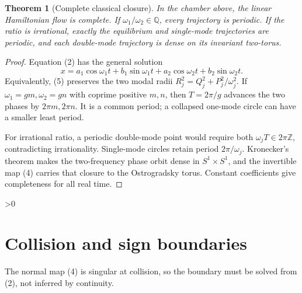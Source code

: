 \documentclass[10pt]{article}
\newtheorem{theorem}{Theorem}
\providecommand{\CRevisionRound}{2}
\begin{document}
\begin{theorem}[Complete classical closure]
In the chamber above, the linear Hamiltonian flow is complete.  If
\(\omega _1/\omega _2\in\mathbb Q\), every trajectory is periodic.  If the
ratio is irrational, exactly the equilibrium and single-mode trajectories
are periodic, and each double-mode trajectory is dense on its invariant
two-torus.
\end{theorem}

\begin{proof}
Equation (2) has the general solution
\begin{equation}
x= a_1\cos\omega _1t+b_1\sin\omega _1t
  +a_2\cos\omega _2t+b_2\sin\omega _2t.
\end{equation}
Equivalently, (5) preserves the two modal radii
\(R_j^2=Q_j^2+P_j^2/\omega_j^2\).  If
\(\omega _1=gm,\omega _2=gn\) with coprime positive \(m,n\), then
\(T=2\pi/g\) advances the two phases by \(2\pi m,2\pi n\).  It is a
common period; a collapsed one-mode circle can have a smaller least period.

For irrational ratio, a periodic double-mode point would require both
\(\omega_jT\in2\pi\mathbb Z\), contradicting irrationality.  Single-mode
circles retain period \(2\pi/\omega_j\).  Kronecker's theorem makes the
two-frequency phase orbit dense in \(S^1\times S^1\), and the invertible map
(4) carries that closure to the Ostrogradsky torus.  Constant coefficients
give completeness for all real time.
\end{proof}

\ifnum\CRevisionRound>0
\section{Collision and sign boundaries}

The normal map (4) is singular at collision, so the boundary must be solved
from (2), not inferred by continuity.
\end{document}
